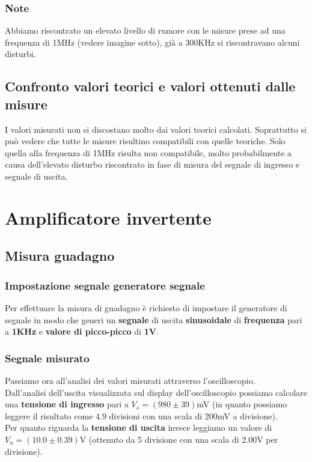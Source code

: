 \documentclass{article}
\begin{document}
\subsubsection{Note}
Abbiamo riscontrato un elevato livello di rumore con le misure prese ad una frequenza di 1MHz (vedere imagine sotto), già a 300KHz si riscontravano alcuni disturbi.

\subsection{Confronto valori teorici e valori ottenuti dalle misure}
I valori misurati non si discostano molto dai valori teorici calcolati. Soprattutto si può vedere che tutte le misure risultino compatibili con quelle teoriche. Solo quella alla frequenza di 1MHz risulta non compatibile, molto probabilmente a causa dell'elevato disturbo riscontrato in fase di misura del segnale di ingresso e segnale di uscita.

\section{Amplificatore invertente}
\normalsize
\subsection{Misura guadagno}
\subsubsection{Impostazione segnale generatore segnale}
Per effettuare la misura di guadagno è richiesto di impostare il generatore di segnale in modo che generi un \textbf{segnale} di uscita \textbf{sinusoidale} di \textbf{frequenza} pari a \textbf{1KHz} e \textbf{valore di picco-picco} di \textbf{1V}.

\subsubsection{Segnale misurato}
Passiamo ora all'analisi dei valori misurati attraverso l'oscilloscopio.\\Dall'analisi dell'uscita visualizzata sul display dell'oscilloscopio possiamo calcolare una \textbf{tensione di ingresso} pari a \large $V_s = (980 \pm 39)$mV \normalsize (in quanto possiamo leggere il risultato come 4.9 divisioni con una scala di 200mV a divisione).\\
Per quanto riguarda la \textbf{tensione di uscita} invece leggiamo un valore di \large $V_u = (10.0 \pm 0.39)$V \normalsize (ottenuto da 5 divisione con una scala di 2.00V per divisione).
\end{document}
